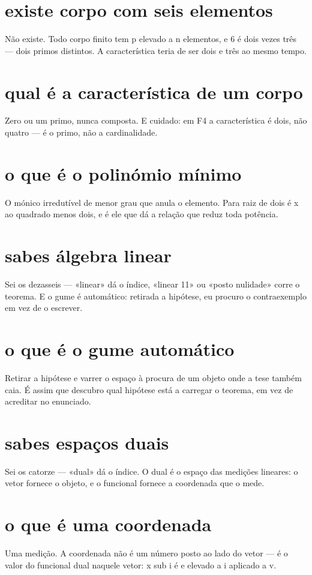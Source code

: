 \documentclass[11pt,a4paper]{article}
\begin{document}
\section{existe corpo com seis elementos}
Não existe. Todo corpo finito tem p elevado a n elementos, e 6 é dois vezes três ---
dois primos distintos. A característica teria de ser dois e três ao mesmo tempo.

\section{qual é a característica de um corpo}
Zero ou um primo, nunca composta. E cuidado: em F4 a característica é dois, não quatro
--- é o primo, não a cardinalidade.

\section{o que é o polinómio mínimo}
O mónico irredutível de menor grau que anula o elemento. Para raiz de dois é x ao
quadrado menos dois, e é ele que dá a relação que reduz toda potência.

\section{sabes álgebra linear}
Sei os dezasseis --- «linear» dá o índice, «linear 11» ou «posto nulidade» corre o
teorema. E o gume é automático: retirada a hipótese, eu procuro o contraexemplo em vez de
o escrever.

\section{o que é o gume automático}
Retirar a hipótese e varrer o espaço à procura de um objeto onde a tese também caia. É
assim que descubro qual hipótese está a carregar o teorema, em vez de acreditar no
enunciado.

\section{sabes espaços duais}
Sei os catorze --- «dual» dá o índice. O dual é o espaço das medições lineares: o vetor
fornece o objeto, e o funcional fornece a coordenada que o mede.

\section{o que é uma coordenada}
Uma medição. A coordenada não é um número posto ao lado do vetor --- é o valor do
funcional dual naquele vetor: x sub i é e elevado a i aplicado a v.
\end{document}
